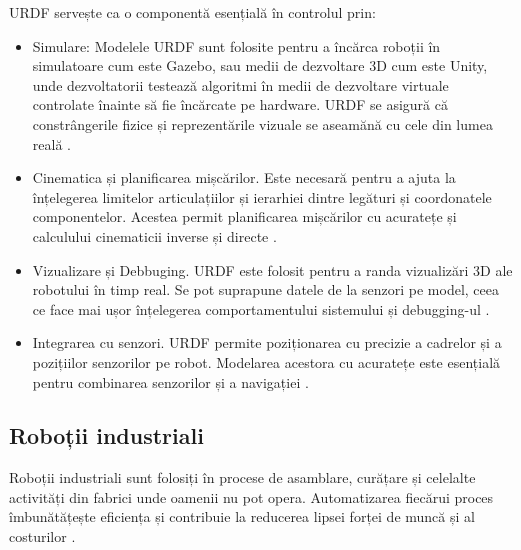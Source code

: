 URDF servește ca o componentă esențială în controlul prin:
\begin{itemize}
	\item Simulare: Modelele URDF sunt folosite pentru a încărca roboții în simulatoare cum este Gazebo, sau medii de dezvoltare 3D cum este Unity, unde dezvoltatorii testează algoritmi în medii de dezvoltare virtuale controlate înainte să fie încărcate pe hardware. URDF se asigură că constrângerile fizice și reprezentările vizuale se aseamănă cu cele din lumea reală \cite{urdf}.
	\item Cinematica și planificarea mișcărilor. Este necesară pentru a ajuta la înțelegerea limitelor articulațiilor și ierarhiei dintre legături și coordonatele componentelor. Acestea permit planificarea mișcărilor cu acuratețe și calculului cinematicii inverse și directe \cite{urdf}.
	\item Vizualizare și Debbuging. URDF este folosit pentru a randa vizualizări 3D ale robotului în timp real. Se pot suprapune datele de la senzori pe model, ceea ce face mai ușor înțelegerea comportamentului sistemului și debugging-ul \cite{urdf}.
	\item Integrarea cu senzori. URDF permite poziționarea cu precizie a cadrelor și a pozițiilor senzorilor pe robot. Modelarea acestora cu acuratețe este esențială pentru combinarea senzorilor și a navigației \cite{urdf}.
\end{itemize}


\subsection{Roboții industriali}
Roboții industriali sunt folosiți în procese de asamblare, curățare și celelalte activități din fabrici unde oamenii nu pot opera. Automatizarea fiecărui proces îmbunătățește eficiența și contribuie la reducerea lipsei forței de muncă și al costurilor \cite{ri}.

